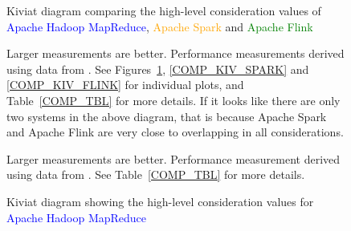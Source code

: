   \begin{figure}[p]
      \begin{floatrow}
          \ffigbox
              {
                  \caption{Kiviat diagram comparing the high-level consideration values of \textcolor{blue}{Apache Hadoop MapReduce}, \textcolor{orange}{Apache Spark} and \textcolor{Green}{Apache Flink}}
                  \label{COMP_KIV_OVERLAY}
              }
              {

                  Larger measurements are better. Performance measurements derived using data from \citeauthor{VEIGA:EVALUATION:2015} \cite{VEIGA:EVALUATION:2015}. See Figures~\ref{COMP_KIV_MR}, \ref{COMP_KIV_SPARK} and \ref{COMP_KIV_FLINK} for individual plots, and Table~\ref{COMP_TBL} for more details. If it looks like there are only two systems in the above diagram, that is because Apache Spark and Apache Flink are very close to overlapping in all considerations.
              }
          \ffigbox
              {
                  \caption{Kiviat diagram showing the high-level consideration values for \textcolor{blue}{Apache Hadoop MapReduce}}
                  \label{COMP_KIV_MR}
              }
              {

                  Larger measurements are better. Performance measurement derived using data from \citeauthor{VEIGA:EVALUATION:2015} \cite{VEIGA:EVALUATION:2015}. See Table~\ref{COMP_TBL} for more details.
              }
      \end{floatrow}
  \end{figure}


